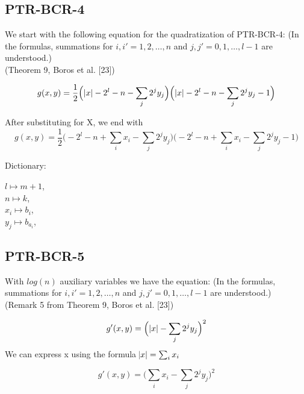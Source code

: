 \documentclass[a4paper,11pt]{article}
\begin{document}
\subsection{PTR-BCR-4} %

We start with the following equation for the quadratization of PTR-BCR-4: (In the formulas, summations for $i,i' = 1,2,\dots,n$ and $j,j' = 0,1,\dots,l-1$ are understood.)
\\(Theorem 9, Boros et al. [23])

\begin{equation}
g(x,y) = \frac{1}{2}\Big(\abs{x} - 2^l - n - \sum_j 2^j y_j\Big)\Big(\abs{x} - 2^l - n - \sum_j 2^j y_j - 1\Big)
\end{equation}

\noindent After substituting for X, we end with
\begin{equation}
g(x,y) = \frac{1}{2}\Big(-2^l - n + \sum_i x_i - \sum_j 2^j y_j\Big)\Big(-2^l - n + \sum_i x_i - \sum_j 2^j y_j - 1\Big)
\end{equation}

\noindent Dictionary:
\begin{multicols}{2}
\noindent $l\mapsto m + 1$,\\
\columnbreak
$n\mapsto k$,\\
$x_i\mapsto b_i$,\\
$y_j\mapsto b_{a_i}$,\\
\end{multicols}



\subsection{PTR-BCR-5} %
With $log(n)$ auxiliary variables we have the equation:
(In the formulas, summations for $i,i' = 1,2,\dots,n$ and $j,j' = 0,1,\dots,l-1$ are understood.)
\\(Remark 5 from Theorem 9, Boros et al. [23])

\begin{equation}
  g'(x,y) = \Big(\abs{x} - \sum_{j}2^jy_j\Big)^2
\end{equation}
We can express x using the formula $\abs{x} = \sum_i x_i$

\begin{equation}
  g'(x,y) = \Big(\sum_{i}x_i - \sum_{j}2^jy_j\Big)^2
\end{equation}
\end{document}
